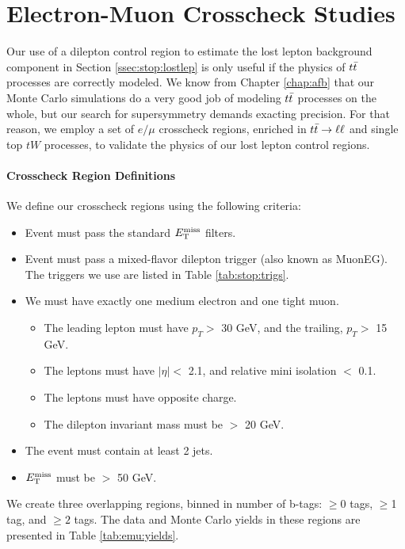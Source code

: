\chapter{Electron-Muon Crosscheck Studies}
\label{apx:stop:emustudies}

Our use of a dilepton control region to estimate the lost lepton
background component in Section \ref{ssec:stop:lostlep} is only useful
if the physics of $t\bar{t}$
processes are correctly modeled. We know from Chapter \ref{chap:afb}
that our Monte Carlo simulations do a very good job of modeling
$t\bar{t}$ processes on the whole, but our search for supersymmetry
demands exacting precision. For that reason, we employ a set of $e/\mu$
crosscheck regions, enriched in $t\bar{t} \rightarrow \ell\ell$ and single top $tW$ processes,
to validate the physics of our lost lepton control regions.

\subsubsection{Crosscheck Region Definitions}
\label{sssec:emu:regdefs}

We define our crosscheck regions using the following criteria:
\begin{itemize}
\item Event must pass the standard $E_\text{T}^\text{miss}$ filters.
\item Event must pass a mixed-flavor dilepton trigger (also known as
  MuonEG). The triggers we use are listed in Table
  \ref{tab:stop:trigs}.
\item We must have exactly one medium electron and one tight muon.
  \begin{itemize}
  \item The leading lepton must have $p_T >$ 30 GeV, and the
    trailing, $p_T >$ 15 GeV.
  \item The leptons must have $|\eta| <$ 2.1, and relative mini
    isolation $<$ 0.1.
  \item The leptons must have opposite charge.
  \item The dilepton invariant mass must be $>$ 20 GeV.
  \end{itemize}
\item The event must contain at least 2 jets.
\item $E_\text{T}^\text{miss}$ must be $>$ 50 GeV.
\end{itemize}
We create three overlapping regions, binned in number of b-tags: $\geq$0 tags, $\geq$1 tag,
and $\geq2$ tags. The data and Monte Carlo yields in these regions are
presented in Table \ref{tab:emu:yields}.

